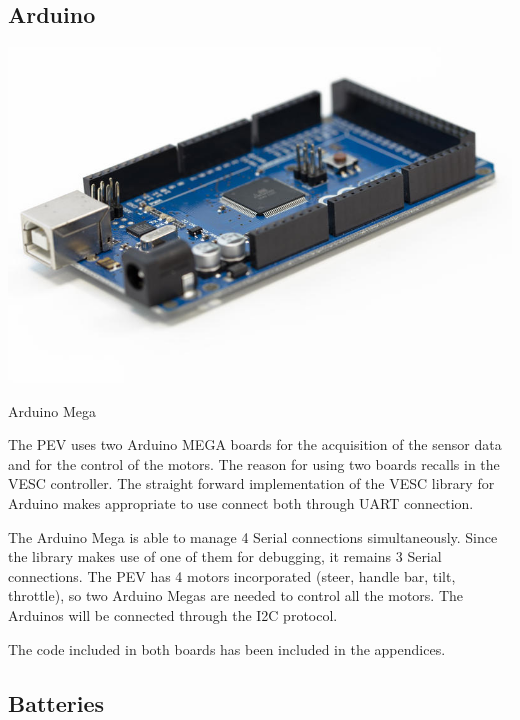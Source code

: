 \newpage
\subsection{Arduino}

\begin{marginfigure}
	\includegraphics[width=1\linewidth]{figs/05/mega}
	\caption{Arduino Mega}
\end{marginfigure}

The PEV uses two Arduino MEGA boards for the acquisition of the sensor data and for the control of the motors. The reason for using two boards recalls in the VESC controller. The straight forward implementation of the VESC library for Arduino makes appropriate to use connect both through UART connection. 

The Arduino Mega is able to manage 4 Serial connections simultaneously. Since the library makes use of one of them for debugging, it remains 3 Serial connections. The PEV has 4 motors incorporated (steer, handle bar, tilt, throttle), so two Arduino Megas are needed to control all the motors. The Arduinos will be connected through the I2C protocol.

The code included in both boards has been included in the appendices.

\subsection{Batteries}

